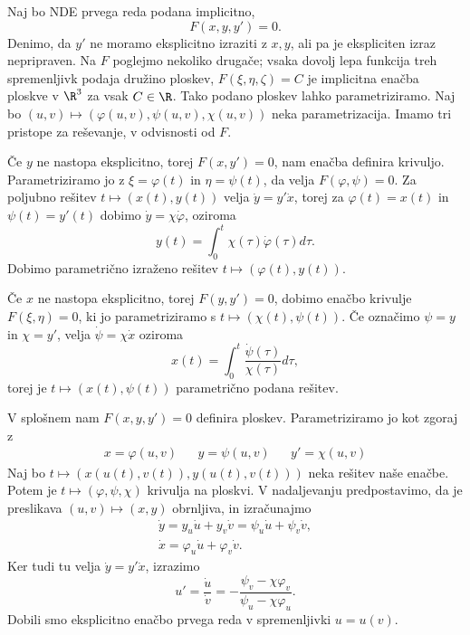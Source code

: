 
Naj bo NDE prvega reda podana implicitno,
\[
  F(x, y, y') = 0.
\]
Denimo, da $y'$ ne moramo eksplicitno izraziti z $x, y$, ali pa je ekspliciten
izraz nepripraven.
Na $F$ poglejmo nekoliko drugače; vsaka dovolj lepa funkcija treh spremenljivk
podaja družino ploskev, $F(\xi, \eta, \zeta) = C$ je implicitna enačba ploskve v
$\R^3$ za vsak $C \in \R$.
Tako podano ploskev lahko parametriziramo.
Naj bo $(u, v) \mapsto (\varphi(u,v), \psi(u,v), \chi(u,v))$ neka
parametrizacija.
Imamo tri pristope za reševanje, v odvisnosti od $F$.

Če $y$ ne nastopa eksplicitno, torej $F(x, y') = 0$, nam enačba definira
krivuljo.
Parametriziramo jo z $\xi = \varphi(t)$ in $\eta = \psi(t)$, da velja
$F(\varphi, \psi) = 0$.
Za poljubno rešitev $t \mapsto (x(t), y(t))$ velja $\dot{y} = y' \dot{x}$, torej
za $\varphi(t) = x(t)$ in $\psi(t) = y'(t)$ dobimo $\dot{y} = \chi
\dot{\varphi}$, oziroma
\[
  y(t) = \int_0^t \chi(\tau) \dot{\varphi}(\tau) d\tau.
\]
Dobimo parametrično izraženo rešitev $t \mapsto (\varphi(t), y(t))$.


Če $x$ ne nastopa eksplicitno, torej $F(y, y') = 0$, dobimo enačbo krivulje
$F(\xi, \eta) = 0$, ki jo parametriziramo s $t \mapsto (\chi(t), \psi(t))$.
Če označimo $\psi = y$ in $\chi = y'$, velja $\dot{\psi} = \chi \dot{x}$ oziroma
\[
  x(t) = \int_0^t \frac{\dot{\psi}(\tau)}{\chi(\tau)} d\tau,
\]
torej je $t \mapsto (x(t), \psi(t))$ parametrično podana rešitev.


V splošnem nam $F(x, y, y') = 0$ definira ploskev.
Parametriziramo jo kot zgoraj z
\begin{align*}
  x = \varphi(u, v) && y = \psi(u, v) && y' = \chi(u,v)
\end{align*}
Naj bo $t \mapsto (x(u(t), v(t)), y(u(t), v(t)))$ neka rešitev naše enačbe.
Potem je $t \mapsto (\varphi, \psi, \chi)$ krivulja na ploskvi.
V nadaljevanju predpostavimo, da je preslikava $(u,v) \mapsto (x, y)$ obrnljiva,
in izračunajmo
\begin{gather*}
  \dot{y} = y_u \dot{u} + y_v \dot{v} = \psi_u \dot{u} + \psi_v \dot{v}, \\
  \dot{x} = \varphi_u \dot{u} + \varphi_v \dot{v}.
\end{gather*}
Ker tudi tu velja $\dot{y} = y' \dot{x}$, izrazimo
\[
  u' = \frac{\dot{u}}{\dot{v}} = - \frac{\psi_v - \chi \varphi_v}{\psi_u - \chi
	\varphi_u}.
\]
Dobili smo eksplicitno enačbo prvega reda v spremenljivki $u = u(v)$.

